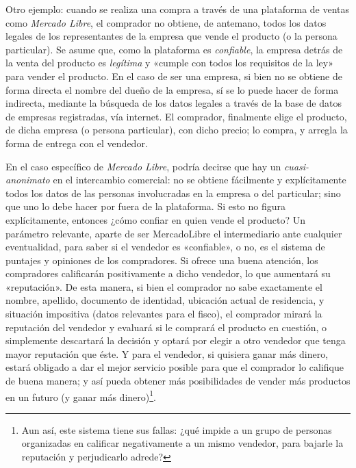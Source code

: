 \documentclass[12pt,a4paper,twoside]{book}
\begin{document}
Otro ejemplo: cuando se realiza una compra a través de una plataforma de ventas como \textit{Mercado Libre}, el comprador no obtiene, de antemano, todos los datos legales de los representantes de la empresa que vende el producto (o la persona particular). Se asume que, como la plataforma es \textit{confiable}, la empresa detrás de la venta del producto es \textit{legítima} y «cumple con todos los requisitos de la ley» para vender el producto. En el caso de ser una empresa, si bien no se obtiene de forma directa el nombre del dueño de la empresa, sí se lo puede hacer de forma indirecta, mediante la búsqueda de los datos legales a través de la base de datos de empresas registradas, vía internet. El comprador, finalmente elige el producto, de dicha empresa (o persona particular), con dicho precio; lo compra, y arregla la forma de entrega con el vendedor.

En el caso específico de \textit{Mercado Libre}, podría decirse que hay un \textit{cuasi-anonimato} en el intercambio comercial: no se obtiene fácilmente y explícitamente todos los datos de las personas involucradas en la empresa o del particular; sino que uno lo debe hacer por fuera de la plataforma. Si esto no figura explícitamente, entonces ¿cómo confiar en quien vende el producto? Un parámetro relevante, aparte de ser MercadoLibre el intermediario ante cualquier eventualidad, para saber si el vendedor es «confiable», o no, es el sistema de puntajes y opiniones de los compradores. Si ofrece una buena atención, los compradores calificarán positivamente a dicho vendedor, lo que aumentará su «reputación». De esta manera, si bien el comprador no sabe exactamente el nombre, apellido, documento de identidad, ubicación actual de residencia, y situación impositiva (datos relevantes para el fisco), el comprador mirará la reputación del vendedor y evaluará si le comprará el producto en cuestión, o simplemente descartará la decisión y optará por elegir a otro vendedor que tenga mayor reputación que éste. Y para el vendedor, si quisiera ganar más dinero, estará obligado a dar el mejor servicio posible para que el comprador lo califique de buena manera; y así pueda obtener más posibilidades de vender más productos en un futuro (y ganar más dinero)\footnote{Aun así, este sistema tiene sus fallas: ¿qué impide a un grupo de personas organizadas en calificar negativamente a un mismo vendedor, para bajarle la reputación y perjudicarlo adrede?}.
\end{document}

